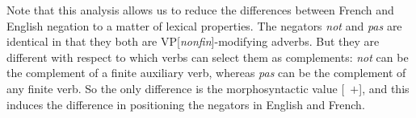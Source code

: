 \documentclass[output=paper
                ,modfonts
                		,nonflat
	        ,collection
	        ,collectionchapter
	        ,collectiontoclongg
 	        ,biblatex
                ,babelshorthands
                ,newtxmath
                ,draftmode
                ,colorlinks, citecolor=brown
]{./langsci/langscibook}
\begin{document}
{\begin{exe}
\begin{xlist}
\begin{exe}
\begin{xlist}
\eal
{}
\zl

\eal
{}
\zl

Note that this analysis allows us to reduce the differences between
French and English negation to a matter of lexical properties.
The negators \textit{not} and \textit{pas} are identical in that they both are
VP[\textit{nonfin}]-modifying adverbs. But they are different with respect to
which verbs can select them as complements:  \textit{not} can be the
complement of a finite auxiliary verb, whereas \textit{pas} can be the
complement of any finite verb.  So the only difference
is the morphosyntactic value [\AUX\ $+$], and this induces
the difference in positioning the negators in English and French.



%




%


\end{xlist}
\end{exe}
\end{xlist}
\end{exe}}
\end{document}

